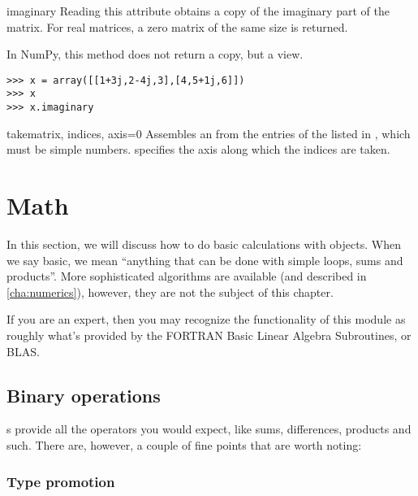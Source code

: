 \begin{memberdesc}[Array]{imaginary}
  Reading this attribute obtains a copy of the imaginary part of the matrix.
  For real matrices, a zero matrix of the same size is returned.

  In NumPy, this method does not return a copy, but a view.
\begin{verbatim}
>>> x = array([[1+3j,2-4j,3],[4,5+1j,6]])
>>> x
>>> x.imaginary
\end{verbatim}
\end{memberdesc}

\begin{funcdesc}{take}{matrix, indices, axis=0}
  Assembles an  from the entries of the 
  listed in , which must be simple numbers. 
  specifies the axis along which the indices are taken.
\end{funcdesc}
\section{ Math}
In this section, we will discuss how to do basic calculations with 
objects. When we say basic, we mean ``anything that can be done with simple
loops, sums and products''. More sophisticated algorithms are available
(and described in \ref{cha:numerics}), however, they are not the subject of this
chapter.

If you are an expert, then you may recognize the functionality of this 
module as roughly what's provided by the FORTRAN Basic Linear Algebra Subroutines,
or BLAS.
\subsection{Binary operations}
s provide all the operators you would expect, like sums,
differences, products and such. There are, however, a couple of fine points
that are worth noting:

\subsubsection{Type promotion}
\label{subsec:arraypromotion}

